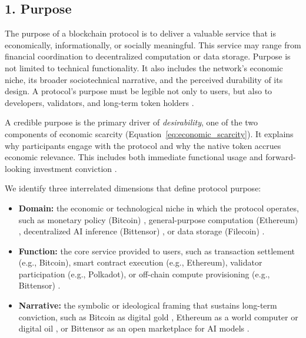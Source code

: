 \documentclass[12pt]{article}
\begin{document}
\subsection*{1. Purpose}

The purpose of a blockchain protocol is to deliver a valuable service that is economically, informationally, or socially meaningful. This service may range from financial coordination to decentralized computation or data storage. Purpose is not limited to technical functionality. It also includes the network’s economic niche, its broader sociotechnical narrative, and the perceived durability of its design. A protocol’s purpose must be legible not only to users, but also to developers, validators, and long-term token holders \citep{gans2019economics, catalini2020some, urquhart2022ethereum}.

A credible purpose is the primary driver of \textit{desirability}, one of the two components of economic scarcity (Equation~\ref{eq:economic_scarcity}). It explains why participants engage with the protocol and why the native token accrues economic relevance. This includes both immediate functional usage and forward-looking investment conviction \citep{huberman2021monetizing, cong2021tokenomics, biais2020blockchain}.

We identify three interrelated dimensions that define protocol purpose:

\begin{itemize}
    \item \textbf{Domain:} the economic or technological niche in which the protocol operates, such as monetary policy (Bitcoin) \citep{nakamoto2008bitcoin}, general-purpose computation (Ethereum) \citep{buterin2022proof}, decentralized AI inference (Bittensor) \citep{rao2023bittensor}, or data storage (Filecoin) \citep{benet2014ipfs}.
    
   \item \textbf{Function:} the core service provided to users, such as transaction settlement (e.g., Bitcoin), smart contract execution (e.g., Ethereum), validator participation (e.g., Polkadot), or off-chain compute provisioning (e.g., Bittensor) \citep{cong2021tokenomics, saleh2021blockchain}.
    
    \item \textbf{Narrative:} the symbolic or ideological framing that sustains long-term conviction, such as Bitcoin as digital gold \citep{gans2019economics, huberman2021monetizing}, Ethereum as a world computer or digital oil \citep{buterin2022proof, urquhart2022ethereum}, or Bittensor as an open marketplace for AI models \citep{rao2023bittensor, gregory2025token}.

\end{itemize}
\end{document}
